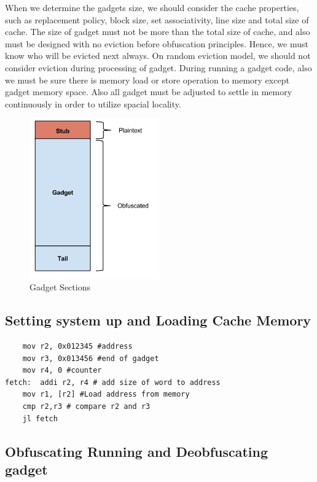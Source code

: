 	    When we determine the gadgets size, we should consider the cache properties, such as replacement policy, block size, set associativity, line size and total size of cache. The size of gadget must not be more than the total size of cache, and also must be designed with no eviction before obfuscation principles. Hence, we must know who will be evicted next always. On random eviction model, we should not consider eviction during processing of gadget. During running a gadget code, also we must be sure there is memory load or store operation to memory except gadget memory space. Also all gadget must be adjusted to settle in memory continuously in order to utilize spacial locality.

	    \begin{figure}[h!]
	        \centering
	        \includegraphics[width=0.5\textwidth]{img/Code_illustration.png}
	        \caption{Gadget Sections}
	        \label{fig:gadgetsections}
	    \end{figure}

 	    \subsection{Setting system up and Loading Cache Memory}
\begin{lstlisting}
	mov r2, 0x012345 #address
	mov r3, 0x013456 #end of gadget
	mov r4, 0 #counter
fetch: 	addi r2, r4 # add size of word to address
	mov r1, [r2] #Load address from memory
	cmp r2,r3 # compare r2 and r3
	jl fetch
\end{lstlisting}
	    \subsection{Obfuscating Running and Deobfuscating gadget}
	


